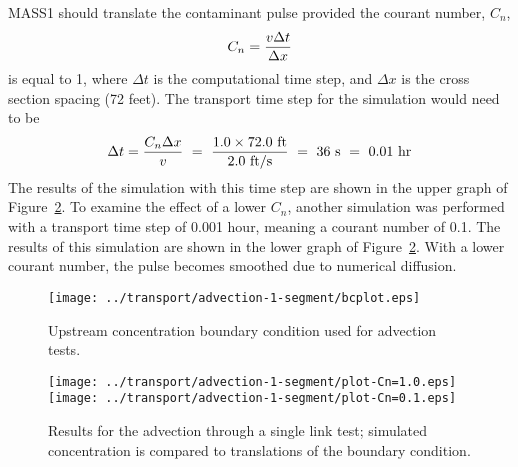 \documentclass[12pt,dvips,letterpaper]{article}
\begin{document}
MASS1 should translate the contaminant pulse provided the courant
number, $C_{n}$,
\begin{equation}
  \label{eq:courant-number}
  C_{n} = { { v \Delta t } \over { \Delta x } }
\end{equation}
is equal to 1, where $\Delta t$ is the computational time step, and
$\Delta x$ is the cross section spacing (72 feet). The transport time
step for the simulation would need to be
\[
\Delta t = { { C_{n} \Delta x } \over v } ~ = ~ {{ 1.0 \times 72.0 ~
    \mathrm{ft}} \over {2.0 ~ \mathrm{ft} \slash \mathrm{s} }} ~ = ~
    36 ~\mathrm{s} ~ = ~ 0.01 ~ \mathrm{hr}
\]
The results of the simulation with this time step are shown in the
upper graph of Figure~\ref{fig:test-advection-1-results}.  To examine
the effect of a lower $C_{n}$, another simulation was performed with a
transport time step of 0.001 hour, meaning a courant number of 0.1.
The results of this simulation are shown in the lower graph of
Figure~\ref{fig:test-advection-1-results}.  With a lower courant
number, the pulse becomes smoothed due to numerical diffusion.  

\begin{figure}[htbp]
  \begin{center}
    \texttt{[image: ../transport/advection-1-segment/bcplot.eps]}
    \caption{Upstream concentration boundary condition used for
      advection tests.} 
    \label{fig:test-advection-bc}
  \end{center}
\end{figure}

\begin{figure}[htbp]
  \begin{center}
    \texttt{[image: ../transport/advection-1-segment/plot-Cn=1.0.eps]}
    \texttt{[image: ../transport/advection-1-segment/plot-Cn=0.1.eps]}
    \caption{Results for the advection through a single link test;
      simulated concentration is compared to translations of the
      boundary condition.} 
    \label{fig:test-advection-1-results}
  \end{center}
\end{figure}



\end{document}
